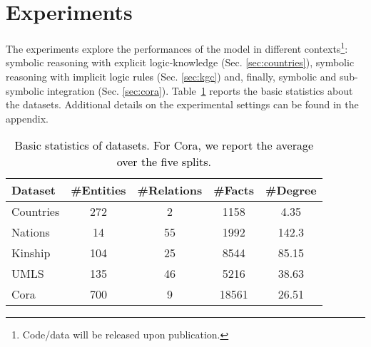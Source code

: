 \documentclass[journal]{IEEEtran}
\newcommand{\ar}[1]{\textcolor{black}{#1}}
\begin{document}
\section{Experiments}
\label{sec:exp_results}
The experiments explore the performances of the model in different contexts\footnote{Code/data will be released upon publication.}: symbolic reasoning with explicit logic-knowledge (Sec. \ref{sec:countries}), symbolic reasoning with \ar{implicit logic rules} (Sec. \ref{sec:kgc}) and, finally, symbolic and sub-symbolic integration (Sec. \ref{sec:cora}).
Table~\ref{tab:symbolic_datasets} reports the basic statistics about the datasets. Additional details on the experimental settings can be found in the appendix.




\begin{table}[t]
\centering
\ar{
{\small
\begin{tabular}{l|cccc}
{\bf Dataset} & \#{\bf Entities} & \#{\bf Relations} & \#{\bf Facts} & \#{\bf Degree}\\
\hline
Countries & 272 & 2 & 1158 & 4.35\\
Nations & 14 & 55 & 1992 & 142.3\\
Kinship & 104 & 25 & 8544 & 85.15 \\
UMLS & 135 & 46 & 5216 & 38.63 \\
Cora & 700 & 9 & 18561 & 26.51
\end{tabular}
}}
\caption{\ar{Basic statistics of datasets. For Cora, we report the average over the five splits.}}
\label{tab:symbolic_datasets}
\end{table}
\end{document}
